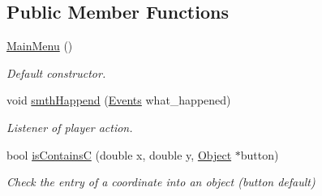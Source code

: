 \subsection*{Public Member Functions}
\begin{DoxyCompactItemize}
\item 
\mbox{\label{class_main_menu_a53eecf9d5ffd094f54ac4193e7e57eaf}} 
\hyperlink{class_main_menu_a53eecf9d5ffd094f54ac4193e7e57eaf}{Main\+Menu} ()
\begin{DoxyCompactList}\small\item\em Default constructor. \end{DoxyCompactList}\item 
void \hyperlink{class_main_menu_aa4272e1cb2c70c23c869d301f2dd2110}{smth\+Happend} (\hyperlink{_events_8h_af60e00b78607064c5be6aa9397ea49c1}{Events} what\+\_\+happened)
\begin{DoxyCompactList}\small\item\em Listener of player action. \end{DoxyCompactList}\item 
bool \hyperlink{class_main_menu_a9b8bc5319e82474ecc03ae19b52c4293}{is\+ContainsC} (double x, double y, \hyperlink{class_object}{Object} $\ast$button)
\begin{DoxyCompactList}\small\item\em Check the entry of a coordinate into an object (button default) \end{DoxyCompactList}\end{DoxyCompactItemize}
